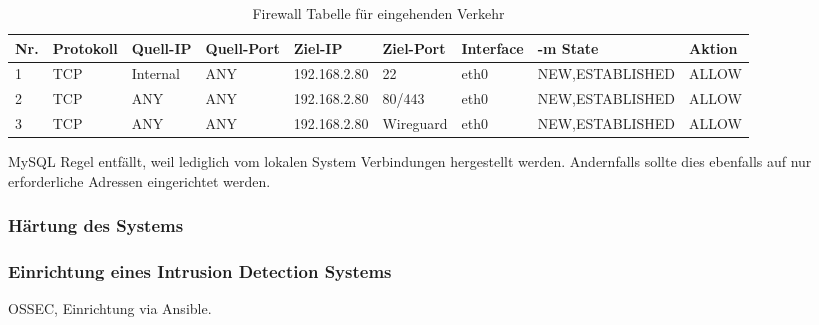 \begin{table}[!ht]
    \centering
    \begin{adjustbox}{width=\textwidth}

    \begin{tabular}{|l|l|l|l|l|l|l|l|l|}
        \hline
            Nr. & Protokoll & Quell-IP & Quell-Port & Ziel-IP & Ziel-Port & Interface & -m State & Aktion \\ \hline
            1 & TCP & Internal & ANY & 192.168.2.80 & 22 & eth0 & NEW,ESTABLISHED & ALLOW \\ \hline
            2 & TCP & ANY & ANY & 192.168.2.80 & 80/443 & eth0 & NEW,ESTABLISHED & ALLOW \\ \hline
            3 & TCP & ANY & ANY & 192.168.2.80 & Wireguard & eth0 & NEW,ESTABLISHED & ALLOW \\ \hline
        \end{tabular}
    \end{adjustbox}
    \caption{Firewall Tabelle für eingehenden Verkehr}
    \label{regeln_fw_incoming}
\end{table}

MySQL Regel entfällt, weil lediglich vom lokalen System Verbindungen hergestellt werden. Andernfalls sollte dies ebenfalls auf nur erforderliche Adressen eingerichtet werden.

\subsubsection{Härtung des Systems}


\subsubsection{Einrichtung eines Intrusion Detection Systems}

OSSEC, Einrichtung via Ansible.



